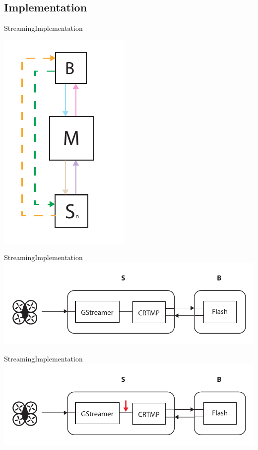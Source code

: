 \subsection{Implementation}

\begin{frame}{Streaming}{Implementation}
  \begin{center}
    \includegraphics[height=0.7\textheight]{images/dataflow_diagram.pdf}
  \end{center}
\end{frame}

\begin{frame}{Streaming}{Implementation}
  \includegraphics[width=1\textwidth]{images/stream_implementation_overview.pdf}
\end{frame}

\begin{frame}{Streaming}{Implementation}
  \includegraphics[width=1\textwidth]{images/stream_implementation_overview2.pdf}
\end{frame}


